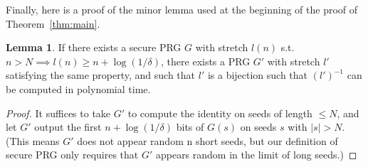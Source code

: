 \documentclass{article}
\theoremstyle{definition}
\newtheorem{lem}[thm]{Lemma}
\theoremstyle{remark}
\begin{document}
Finally, here is a proof of the minor lemma used at the beginning of the proof of Theorem~\ref{thm:main}.
\begin{lem} \label{lem:bijective_stretch}
If there exists a secure PRG $G$ with stretch $l(n)$ s.t. $n > N \implies l(n) \geq n + \log(1/\delta)$,
there exists a PRG $G'$ with stretch $l'$ satisfying the same property, and such that $l'$ is a bijection
such that $(l')^{-1}$ can be computed in polynomial time.
\end{lem}
\begin{proof}
It suffices to take $G'$ to compute the identity on seeds of length $\leq N$, and let $G'$ output the first $n + \log(1/\delta)$ bits of $G(s)$ on seeds $s$ with $|s| > N$.
(This means $G'$ does not appear random n short seeds, but our definition of secure PRG only requires that $G'$ appears random in the limit of long seeds.)
\end{proof}

\end{document}
